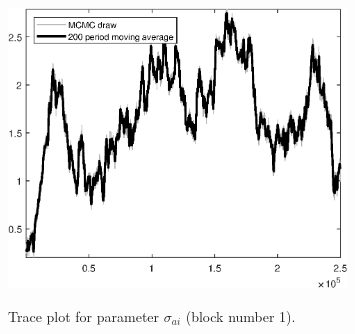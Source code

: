 \begin{figure}[H]
\centering
  \includegraphics[width=0.8\textwidth]{BRS_aggregate/graphs/TracePlot_sigma_ai_blck_1}\\
    \caption{Trace plot for parameter ${\sigma_{ai}}$ (block number 1).}
\end{figure}
